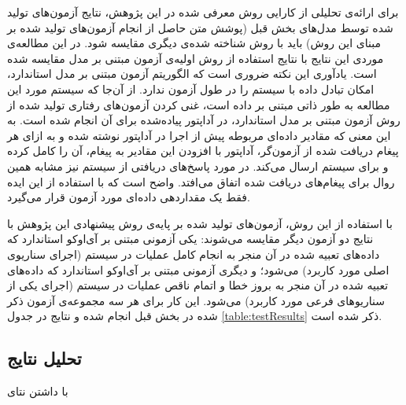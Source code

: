 برای ارائه‌ی تحلیلی از کارایی روش معرفی شده در این پژوهش، نتایج آزمون‌های تولید شده توسط مدل‌های بخش قبل (پوشش متن حاصل از انجام آزمون‌های تولید شده بر مبنای این روش) باید با روش شناخته شده‌ی دیگری مقایسه شود. در این مطالعه‌ی موردی این نتایج با نتایج استفاده از روش اولیه‌ی آزمون مبتنی بر مدل مقایسه شده است. یادآوری این نکته ضروری است که الگوریتم آزمون مبتنی بر مدل استاندارد، امکان تبادل داده با سیستم را در طول آزمون ندارد. از آن‌جا که سیستم مورد این مطالعه به طور ذاتی مبتنی بر داده است، غنی کردن آزمون‌های رفتاری تولید شده از روش آزمون مبتنی بر مدل استاندارد، در آداپتور پیاده‌شده برای آن انجام شده است. به این معنی که مقادیر داده‌ای مربوطه پیش از اجرا در آداپتور نوشته شده و به ازای هر پیغام دریافت شده از آزمون‌گر، آداپتور با افزودن این مقادیر به پیغام، آن را کامل کرده و برای سیستم ارسال می‌کند. در مورد پاسخ‌های دریافتی از سیستم نیز مشابه همین روال برای پیغام‌های دریافت شده اتفاق می‌افتد. واضح است که با استفاده از این ایده فقط یک مقداردهی داده‌ای مورد آزمون قرار می‌گیرد.

با استفاده از این روش، آزمون‌های تولید شده بر پایه‌ی روش پیشنهادی این پژوهش با نتایج دو آزمون دیگر مقایسه می‌شوند: یکی آزمونی مبتنی بر آی‌اوکو استاندارد که داده‌های تعبیه شده در آن منجر به انجام کامل عملیات در سیستم (اجرای سناریوی اصلی مورد کاربرد) می‌شود؛ و دیگری آزمونی مبتنی بر آی‌اوکو استاندارد که داده‌های تعبیه شده در آن منجر به بروز خطا و اتمام ناقص عملیات در سیستم (اجرای یکی از سناریوهای فرعی مورد کاربرد) می‌شود. این کار برای هر سه مجموعه‌ی آزمون ذکر شده در بخش قبل انجام شده و نتایج در جدول \ref{table:testResults} ذکر شده است.


\subsection{تحلیل نتایج}
با داشتن نتای